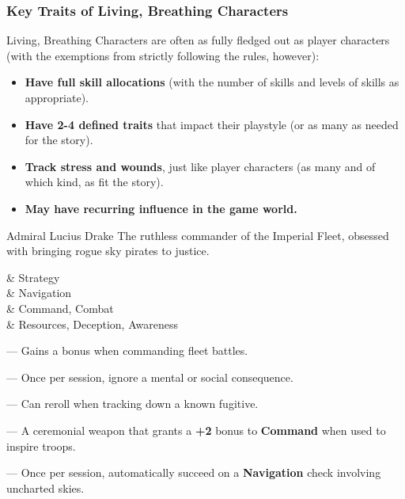 \subsubsection{Key Traits of Living, Breathing Characters}
Living, Breathing Characters are often as fully fledged out as player characters (with the exemptions from strictly following the rules, however):
\begin{itemize}
    \item \textbf{Have full skill allocations} (with the number of skills and levels of skills as appropriate).
    \item \textbf{Have 2-4 defined traits} that impact their playstyle (or as many as needed for the story).
    \item \textbf{Track stress and wounds}, just like player characters (as many and of which kind, as fit the story).
    \item \textbf{May have recurring influence in the game world.}
\end{itemize}
\begin{Example}{Admiral Lucius Drake}
	The ruthless commander of the Imperial Fleet, obsessed with bringing rogue sky pirates to justice.
  
	\vspace{0.5\baselineskip}
  
	\begin{SkillsBox}
	  \Superior & Strategy \\
	  \Expert & Navigation \\
	  \Skilled & Command, Combat \\
	  \Novice & Resources, Deception, Awareness \\
	\end{SkillsBox}
  
	\begin{TraitsBox}
	  \item[Master Tactician] — Gains a bonus when commanding fleet battles.
	  \item[Iron Will] — Once per session, ignore a mental or social consequence.
	  \item[Unyielding Pursuit] — Can reroll when tracking down a known fugitive.
	\end{TraitsBox}
  
	\begin{GearBox}
	  \item[Imperial Signet Blade] — A ceremonial weapon that grants a \textbf{+2} bonus to \textbf{Command} when used to inspire troops.
	  \item[Sky Admiral’s Compass] — Once per session, automatically succeed on a \textbf{Navigation} check involving uncharted skies.
	\end{GearBox}
  
	\DamageBox
  \end{Example}

